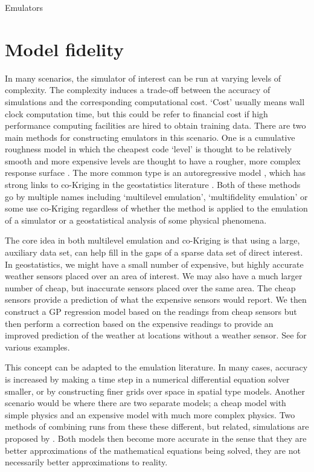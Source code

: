 \begin{chapter}{Emulators \label{Ch:Emulators}}
\section{Model fidelity}
In many scenarios, the simulator of interest can be run at varying levels of complexity. The complexity induces a trade-off between the accuracy of simulations and the corresponding computational cost. `Cost' usually means wall clock computation time, but this could be refer to financial cost if high performance computing facilities are hired to obtain training data.
There are two main methods for constructing emulators in this scenario. One is a cumulative roughness model in which the cheapest code `level' is thought to be relatively smooth and more expensive levels are thought to have a rougher, more complex response surface \citep{Kennedy2000}. The more common type is an autoregressive model \citep{Forrester2007}, which has strong links to co-Kriging in the geostatistics literature \citep{Stein1991}. Both of these methods go by multiple names including `multilevel emulation', `multifidelity emulation' or some use co-Kriging regardless of whether the method is applied to the emulation of a simulator or a geostatistical analysis of some physical phenomena.

The core idea in both multilevel emulation and co-Kriging is that using a large, auxiliary data set, can help fill in the gaps of a sparse data set of direct interest. In geostatistics, we might have a small number of expensive, but highly accurate weather sensors placed over an area of interest. We may also have a much larger number of cheap, but inaccurate sensors placed over the same area. The cheap sensors provide a prediction of what the expensive sensors would report. We then construct a GP regression model based on the readings from cheap sensors but then perform a correction based on the expensive readings to provide an improved prediction of the weather at locations without a weather sensor. See \citet{Yates1987,Ashraf1997,Lark2007,Adhikary2017} for various examples.

This concept can be adapted to the emulation literature. In many cases, accuracy is increased by making a time step in a numerical differential equation solver smaller, or by constructing finer grids over space in spatial type models. Another scenario would be where there are two separate models; a cheap model with simple physics and an expensive model with much more complex physics.
Two methods of combining runs from these these different, but related, simulations are proposed by \citet{Kennedy2000}. Both models then become more accurate in the sense that they are better approximations of the mathematical equations being solved, they are not necessarily better approximations to reality.

\end{chapter}
